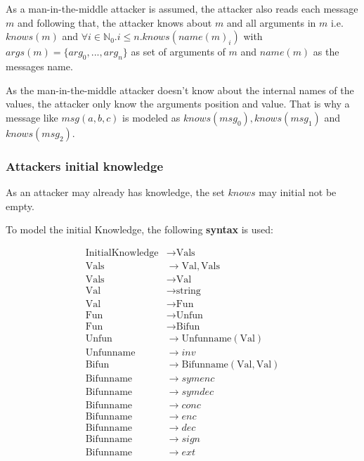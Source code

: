 \documentclass[12pt,journal,compsoc]{IEEEtran}
\newcommand{\MITMA}[0]{man-in-the-middle attacker }
\newcommand{\knowsname}[0]{knows}
\newcommand{\knows}[1]{\knowsname (#1)}
\newcommand{\linesep}[0]{\newline}
\begin{document}
As a \MITMA is assumed, the attacker also reads each message $m$ and following that, the attacker 
knows about $m$ and all arguments in $m$ i.e. $\knows{m}$ and $\forall i \in \mathbb{N}_0 . i \leq n . \knows{name(m)_i}$ with
$args(m) = \{ arg_0 , ... , arg_n \}$ as set of arguments of $m$ and $name(m)$ as the messages name.
\linesep

As the \MITMA doesn't know about the internal names of the values, the attacker only know the arguments position 
and value. That is why a message like $msg(a,b,c)$ is modeled as $\knows{msg_0}, \knows{msg_1}$ and $\knows{msg_2}$.

\subsubsection{Attackers initial knowledge} \label{subsubsec:initialsyntax}

As an attacker may already has knowledge, the set 
$\knowsname$ may initial not be empty. 

To model the initial Knowledge, the following \textbf{syntax} is used:

\begin{small}
\begin{align*}
	\text{InitialKnowledge}&\rightarrow \text{Vals}				\\
	\text{Vals}    		&\rightarrow \text{Val},\text{Vals}					\\
	\text{Vals}    		&\rightarrow \text{Val}						\\
	\text{Val}    		&\rightarrow \text{string}				\\
	\text{Val}    		&\rightarrow  \text{Fun}						\\
	\text{Fun}  			&\rightarrow \text{Unfun}						\\
	\text{Fun}  			&\rightarrow \text{Bifun}						\\
	\text{Unfun}			&\rightarrow \text{Unfunname} ( \text{Val} )			\\
	\text{Unfunname}		&\rightarrow inv						\\
	\text{Bifun}			&\rightarrow \text{Bifunname} ( \text{Val} , \text{Val} )		\\
	\text{Bifunname}		&\rightarrow symenc 					\\
	\text{Bifunname}		&\rightarrow symdec 					\\
	\text{Bifunname}		&\rightarrow conc 						\\
	\text{Bifunname}		&\rightarrow enc						\\
	\text{Bifunname}		&\rightarrow dec 						\\
	\text{Bifunname}		&\rightarrow sign						\\
	\text{Bifunname}		&\rightarrow ext		
\end{align*}
\end{small}
\end{document}
